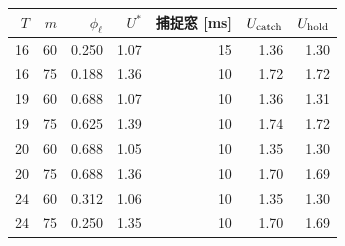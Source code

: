 \begin{tabular}{rrrrrrr}
\toprule
$T$ & $m$ & $\phi_\ell$ & $U^*$ & 捕捉窓 [ms] & $U_{\rm catch}$ & $U_{\rm hold}$ \\
\midrule
16 & 60 & 0.250 & 1.07 & 15 & 1.36 & 1.30 \\
16 & 75 & 0.188 & 1.36 & 10 & 1.72 & 1.72 \\
19 & 60 & 0.688 & 1.07 & 10 & 1.36 & 1.31 \\
19 & 75 & 0.625 & 1.39 & 10 & 1.74 & 1.72 \\
20 & 60 & 0.688 & 1.05 & 10 & 1.35 & 1.30 \\
20 & 75 & 0.688 & 1.36 & 10 & 1.70 & 1.69 \\
24 & 60 & 0.312 & 1.06 & 10 & 1.35 & 1.30 \\
24 & 75 & 0.250 & 1.35 & 10 & 1.70 & 1.69 \\
\bottomrule
\end{tabular}
